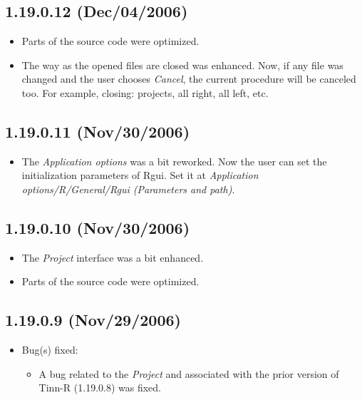 \subsection{1.19.0.12 (Dec/04/2006)}

\begin{itemize}
  \item Parts of the source code were optimized.
  \item The way as the opened files are closed was enhanced. Now, if any file
    was changed and the user chooses \textit{Cancel}, the current procedure
    will be canceled too. For example, closing: projects, all right, all left,
    etc.
\end{itemize}


\subsection{1.19.0.11 (Nov/30/2006)}

\begin{itemize}
  \item The \textit{Application options} was a bit reworked. Now the user can
    set the initialization parameters of Rgui. Set it at \textit{Application
      options/R/General/Rgui (Parameters and path)}.
\end{itemize}


\subsection{1.19.0.10 (Nov/30/2006)}

\begin{itemize}
  \item The \textit{Project} interface was a bit enhanced.
  \item Parts of the source code were optimized.
\end{itemize}


\subsection{1.19.0.9 (Nov/29/2006)}

\begin{itemize}
  \item Bug(s) fixed:
    \begin{itemize}
      \item A bug related to the \textit{Project} and associated with the prior
        version of Tinn-R (1.19.0.8) was fixed.
    \end{itemize}
\end{itemize}


